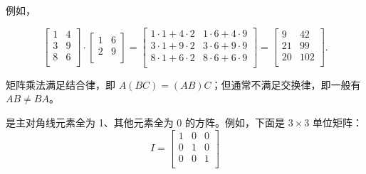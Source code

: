 例如，

\[
 \begin{bmatrix}
  1 & 4 \\
  3 & 9 \\
  8 & 6 \\
 \end{bmatrix}
\cdot
 \begin{bmatrix}
  1 & 6 \\
  2 & 9 \\
 \end{bmatrix}
=
 \begin{bmatrix}
  1 \cdot 1 + 4 \cdot 2 & 1 \cdot 6 + 4 \cdot 9 \\
  3 \cdot 1 + 9 \cdot 2 & 3 \cdot 6 + 9 \cdot 9 \\
  8 \cdot 1 + 6 \cdot 2 & 8 \cdot 6 + 6 \cdot 9 \\
 \end{bmatrix}
=
 \begin{bmatrix}
  9 & 42 \\
  21 & 99 \\
  20 & 102 \\
 \end{bmatrix}.
\]

矩阵乘法满足结合律，即 $A(BC)=(AB)C$；但通常不满足交换律，即一般有 $AB \ne BA$。


是主对角线元素全为 1、其他元素全为 0 的方阵。例如，下面是 $3 \times 3$ 单位矩阵：
\[
 I = \begin{bmatrix}
  1 & 0 & 0 \\
  0 & 1 & 0 \\
  0 & 0 & 1 \\
 \end{bmatrix}
\]

